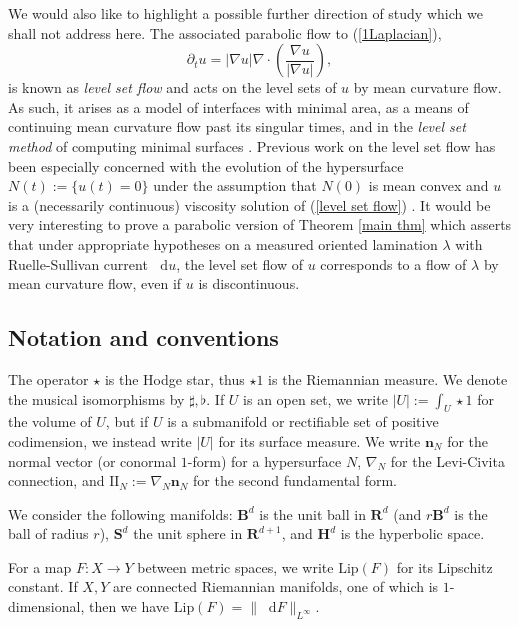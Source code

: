 \documentclass[reqno,11pt]{amsart}
\newcommand{\RR}{\mathbf{R}}
\newcommand{\Hyp}{\mathbf H}
\newcommand{\Sph}{\mathbf S}
\newcommand{\Ball}{\mathbf{B}}
\newcommand*\dif{\mathop{}\!\mathrm{d}}
\newcommand{\Two}{\mathrm{I\!I}}
\newcommand{\normal}{\mathbf n}
\newcommand{\Lip}{\mathrm{Lip}}
\newcommand{\dfn}[1]{\emph{#1}\index{#1}}
\theoremstyle{definition}
\numberwithin{equation}{section}
\begin{document}
We would also like to highlight a possible further direction of study which we shall not address here.
The associated parabolic flow to (\ref{1Laplacian}),
\begin{equation}\label{level set flow}
\partial_t u = |\nabla u| \nabla \cdot \left(\frac{\nabla u}{|\nabla u|}\right),
\end{equation}
is known as \dfn{level set flow} and acts on the level sets of $u$ by mean curvature flow.
As such, it arises as a model of interfaces with minimal area, as a means of continuing mean curvature flow past its singular times, and in the \dfn{level set method} of computing minimal surfaces \cite{Chen89,Thomas05}.
Previous work on the level set flow has been especially concerned with the evolution of the hypersurface $N(t) := \{u(t) = 0\}$ under the assumption that $N(0)$ is mean convex and $u$ is a (necessarily continuous) viscosity solution of (\ref{level set flow}) \cite{Evans91,Colding2016RegularityOT,sun2022generic}.
It would be very interesting to prove a parabolic version of Theorem \ref{main thm} which asserts that under appropriate hypotheses on a measured oriented lamination $\lambda$ with Ruelle-Sullivan current $\dif u$, the level set flow of $u$ corresponds to a flow of $\lambda$ by mean curvature flow, even if $u$ is discontinuous.


\subsection{Notation and conventions}
The operator $\star$ is the Hodge star, thus $\star 1$ is the Riemannian measure.
We denote the musical isomorphisms by $\sharp, \flat$.
If $U$ is an open set, we write $|U| := \int_U \star 1$ for the volume of $U$, but if $U$ is a submanifold or rectifiable set of positive codimension, we instead write $|U|$ for its surface measure.
We write $\normal_N$ for the normal vector (or conormal $1$-form) for a hypersurface $N$, $\nabla_N$ for the Levi-Civita connection, and $\Two_N := \nabla_N \normal_N$ for the second fundamental form.

We consider the following manifolds: $\Ball^d$ is the unit ball in $\RR^d$ (and $r\Ball^d$ is the ball of radius $r$), $\Sph^d$ the unit sphere in $\RR^{d + 1}$, and $\Hyp^d$ is the hyperbolic space.

For a map $F: X \to Y$ between metric spaces, we write $\Lip(F)$ for its Lipschitz constant.
If $X, Y$ are connected Riemannian manifolds, one of which is $1$-dimensional, then we have $\Lip(F) = \|\dif F\|_{L^\infty}$.
\end{document}
